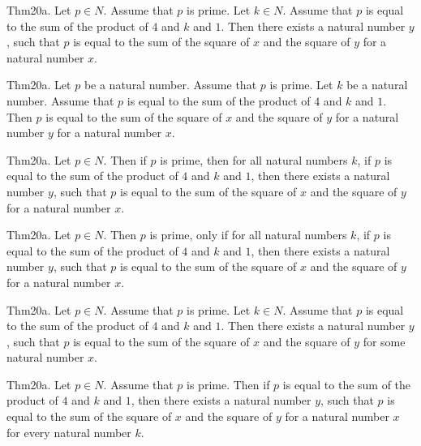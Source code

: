 \documentclass{article}
\begin{document}
Thm20a. Let $p \in N$. Assume that $p$ is prime. Let $k \in N$. Assume that $p$ is equal to the sum of the product of $4$ and $k$ and $1$. Then there exists a natural number $y$, such that $p$ is equal to the sum of the square of $x$ and the square of $y$ for a natural number $x$.

Thm20a. Let $p$ be a natural number. Assume that $p$ is prime. Let $k$ be a natural number. Assume that $p$ is equal to the sum of the product of $4$ and $k$ and $1$. Then $p$ is equal to the sum of the square of $x$ and the square of $y$ for a natural number $y$ for a natural number $x$.

Thm20a. Let $p \in N$. Then if $p$ is prime, then for all natural numbers $k$, if $p$ is equal to the sum of the product of $4$ and $k$ and $1$, then there exists a natural number $y$, such that $p$ is equal to the sum of the square of $x$ and the square of $y$ for a natural number $x$.

Thm20a. Let $p \in N$. Then $p$ is prime, only if for all natural numbers $k$, if $p$ is equal to the sum of the product of $4$ and $k$ and $1$, then there exists a natural number $y$, such that $p$ is equal to the sum of the square of $x$ and the square of $y$ for a natural number $x$.

Thm20a. Let $p \in N$. Assume that $p$ is prime. Let $k \in N$. Assume that $p$ is equal to the sum of the product of $4$ and $k$ and $1$. Then there exists a natural number $y$, such that $p$ is equal to the sum of the square of $x$ and the square of $y$ for some natural number $x$.

Thm20a. Let $p \in N$. Assume that $p$ is prime. Then if $p$ is equal to the sum of the product of $4$ and $k$ and $1$, then there exists a natural number $y$, such that $p$ is equal to the sum of the square of $x$ and the square of $y$ for a natural number $x$ for every natural number $k$.
\end{document}
